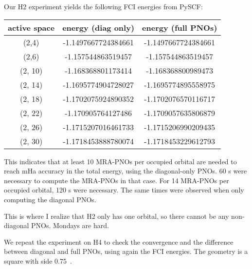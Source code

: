 \documentclass{article}
\begin{document}
Our H2 experiment yields the following FCI energies from PySCF:
\begin{center}
\begin{tabular}{ |c| c|c| }
\hline
 active space &  energy (diag only) & energy (full PNOs) \\ 
 \hline 
 (2,4) & -1.1497667724384661 & -1.1497667724384661 \\
 \hline
 (2,6) & -1.157544863519457 & -1.157544863519457 \\
 \hline
 (2, 10) & -1.168368801173414 & -1.168368800989473 \\
 \hline
 (2, 14) & -1.1695774904728027 & -1.1695774895558975 \\
 \hline
 (2, 18) & -1.1702075924890352 & -1.1702076570116717 \\
 \hline
 (2, 22) & -1.170905764127486 & -1.1709057635806879 \\
 \hline
 (2, 26) & -1.1715207016461733 & -1.1715206990209435 \\
 \hline
 (2, 30) & -1.1718453888780074 & -1.1718453229612793 \\
 \hline
\end{tabular}
\end{center}

This indicates that at least 10 MRA-PNOs per occupied orbital are needed to reach mHa accuracy in the total energy, using the diagonal-only PNOs. 60 s were necessary to compute the MRA-PNOs in that case. For 14 MRA-PNOs per occupied orbital, 120 s were necessary. The same times were observed when only computing the diagonal PNOs.

This is where I realize that H2 only has one orbital, so there cannot be any non-diagonal PNOs. Mondays are hard.

We repeat the experiment on H4 to check the convergence and the difference between diagonal and full PNOs, using again the FCI energies. The geometry is a square with side 0.75~\A{}.
\end{document}
